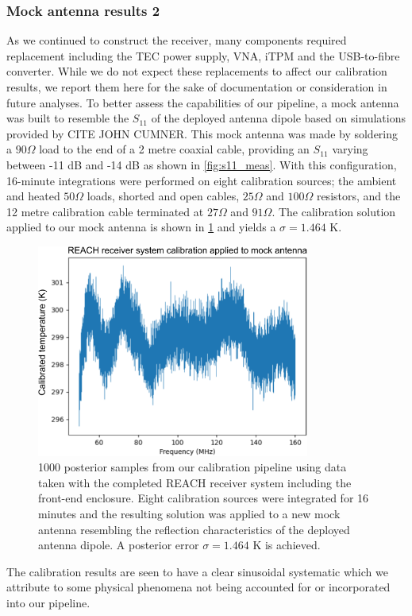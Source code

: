 \subsubsection{Mock antenna results 2}
As we continued to construct the receiver, many components required replacement including the TEC power supply, VNA, iTPM and the USB-to-fibre converter. While we do not expect these replacements to affect our calibration results, we report them here for the sake of documentation or consideration in future analyses. To better assess the capabilities of our pipeline, a mock antenna was built to resemble the $S_{11}$ of the deployed antenna dipole based on simulations provided by CITE JOHN CUMNER. This mock antenna was made by soldering a $90 \Omega$ load to the end of a 2 metre coaxial cable, providing an $S_{11}$ varying between -11 dB and -14 dB as shown in \cref{fig:s11_meas}. With this configuration, 16-minute integrations were performed on eight calibration sources; the ambient and heated $50 \Omega$ loads, shorted and open cables, $25 \Omega$ and $100 \Omega$ resistors, and the 12 metre calibration cable terminated at $27 \Omega$ and $91 \Omega$. The calibration solution applied to our mock antenna is shown in \cref{fig:reach_results_2} and yields a $\sigma = 1.464$ K.
\begin{figure}
    \centering
    \includegraphics[width=0.8\textwidth]{reach_results_2}
    \caption{1000 posterior samples from our calibration pipeline using data taken with the completed REACH receiver system including the front-end enclosure. Eight calibration sources were integrated for 16 minutes and the resulting solution was applied to a new mock antenna resembling the reflection characteristics of the deployed antenna dipole. A posterior error $\sigma = 1.464$ K is achieved.}
    \label{fig:reach_results_2}
\end{figure}
The calibration results are seen to have a clear sinusoidal systematic which we attribute to some physical phenomena not being accounted for or incorporated into our pipeline.

